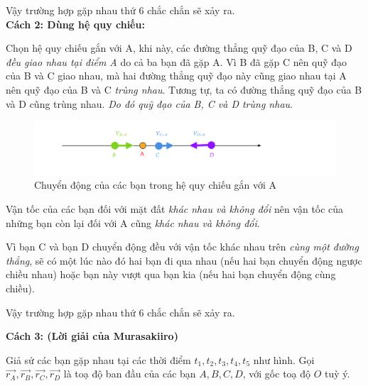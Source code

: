 \begin{enumerate}
Vậy trường hợp gặp nhau thứ 6 chắc chắn sẽ xảy ra.\\

\textbf{Cách 2: Dùng hệ quy chiếu:}

Chọn hệ quy chiếu gắn với A, khi này, các đường thẳng quỹ đạo của B, C và D \textit{đều giao nhau tại điểm A} do cả ba bạn đã gặp A. Vì B đã gặp C nên quỹ đạo của B và C giao nhau, mà hai đường thẳng quỹ đạo này cũng giao nhau tại A nên quỹ đạo của B và C \textit{trùng nhau}. Tương tự, ta có đường thẳng quỹ đạo của B và D cũng trùng nhau. \textit{Do đó quỹ đạo của B, C và D trùng nhau}.

\begin{figure}[H]
\centering
\includegraphics[scale = 0.3]{Problem_1/Image/Cach 2.png}
\caption{Chuyển động của các bạn trong hệ quy chiếu gắn với A}
\end{figure}


Vận tốc của các bạn đối với mặt đất \textit{khác nhau và không đổi} nên vận tốc của những bạn còn lại đối với A cũng \textit{khác nhau và không đổi}.

Vì bạn C và bạn D chuyển động đều với vận tốc khác nhau trên \textit{cùng một đường thẳng}, sẽ có một lúc nào đó hai bạn đi qua nhau (nếu hai bạn chuyển động ngược chiều nhau) hoặc bạn này vượt qua bạn kia (nếu hai bạn chuyển động cùng chiều).

Vậy trường hợp gặp nhau thứ 6 chắc chắn sẽ xảy ra.

\textbf{Cách 3: (Lời giải của Murasakiiro)}

Giả sử các bạn gặp nhau tại các thời điểm $t_1, t_2, t_3, t_4, t_5$ như hình. Gọi $\Vec{r_A}, \Vec{r_B}, \Vec{r_C}, \Vec{r_D}$ là toạ độ ban đầu của các bạn $A, B, C, D$, với gốc toạ độ $O$ tuỳ ý.

\begin{center}
\end{center}
\end{enumerate}
